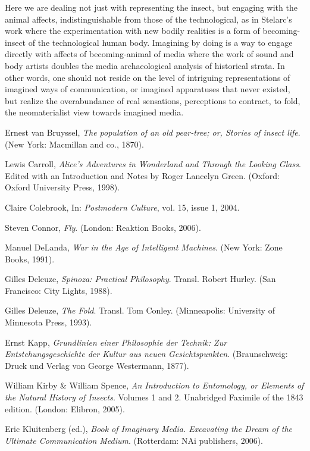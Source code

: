 {Here we are dealing not just with representing the insect, but engaging
with the animal affects, indistinguishable from those of the
technological, as in Stelarc's work where the experimentation with new
bodily realities is a form of becoming{}-insect of the technological
human body. Imagining by doing is a way to engage directly with affects
of becoming{}-animal of media where the work of sound and body artists
doubles the media archaeological analysis of historical strata. In
other words, one should not reside on the level of intriguing
representations of imagined ways of communication, or imagined
apparatuses that never existed, but realize the overabundance of real
sensations, perceptions to contract, to fold, the neomaterialist view
towards imagined media.

\page


Ernest van Bruyssel, {\em The population of an old pear{}-tree; or,
Stories of insect life}. (New York: Macmillan and co., 1870).

Lewis Carroll, {\em Alice's Adventures in Wonderland and Through the
Looking Glass}. Edited with an Introduction and Notes by Roger Lancelyn
Green. (Oxford: Oxford University Press, 1998).

Claire Colebrook,  In: {\em Postmodern Culture}, vol. 15, issue
1, 2004.

Steven Connor, {\em Fly}. (London: Reaktion Books, 2006).

Manuel DeLanda, {\em War in the Age of Intelligent Machines}. (New
York: Zone Books, 1991).

Gilles Deleuze, {\em Spinoza: Practical Philosophy}. Transl. Robert
Hurley. (San Francisco: City Lights, 1988).

Gilles Deleuze, {\em The Fold}. Transl. Tom Conley. (Minneapolis:
University of Minnesota Press, 1993).

Ernst Kapp, {\em Grundlinien einer Philosophie der Technik: Zur
Entstehungsgeschichte der Kultur aus neuen Gesichtspunkten}.
(Braunschweig: Druck und Verlag von George Westermann, 1877).

William Kirby \& William Spence, {\em An Introduction to Entomology,
or Elements of the Natural History of Insects}. Volumes 1 and 2.
Unabridged Faximile of the 1843 edition. (London: Elibron, 2005).

Eric Kluitenberg (ed.), {\em Book of Imaginary Media. Excavating the
Dream of the Ultimate Communication Medium}. (Rotterdam: NAi
publishers, 2006).

}

